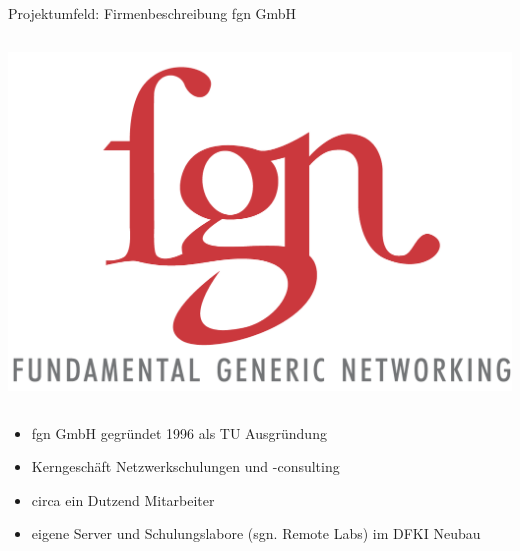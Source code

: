 \documentclass[presentation,svgnames,12pt]{beamer}
\begin{document}
\subsection{}
\begin{frame}{Projektumfeld: Firmenbeschreibung fgn GmbH}
\begin{columns}[c]
	\begin{column}{2.5cm}
		\includegraphics[scale=0.7]{Bilder/logo_fgn.png}
	\end{column}
\end{columns}
\vspace{6pt}
\begin{itemize}
	\item fgn GmbH gegründet 1996 als TU Ausgründung
	\item Kerngeschäft Netzwerkschulungen und -consulting
	\item circa ein Dutzend Mitarbeiter
	\item eigene Server und Schulungslabore (sgn. Remote Labs) im DFKI Neubau
\end{itemize}
\end{frame}
\end{document}
